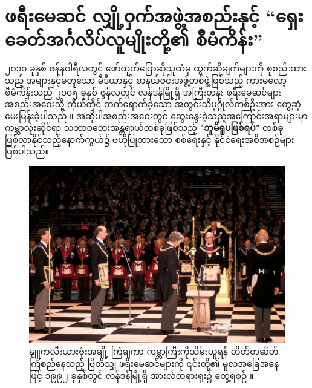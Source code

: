 \documentclass[10pt,twocolumn,letterpaper]{article}
\begin{document}
\section{ဖရီးမေဆင် လျှို့ဝှက်အဖွဲ့အစည်းနှင့် “ရှေးခေတ်အင်္ဂလိပ်လူမျိုးတို့၏ စီမံကိန်း”}

၂၀၁၀ ခုနှစ် ဇန်နဝါရီလတွင် ဖော်ထုတ်ပြောဆိုသူထံမှ ထွက်ဆိုချက်များကို စုစည်းထားသည့် အများနှင့်မတူသော မီဒီယာနှင့် စာနယ်ဇင်းအဖွဲ့တစ်ဖွဲ့ဖြစ်သည့် ကားမလော့စီမံကိန်းသည် ၂၀၀၅ ခုနှစ် ဇွန်လတွင် လန်ဒန်မြို့ရှိ အကြီးတန်း ဖရီးမေဆင်များ အစည်းအဝေးသို့ ကိုယ်တိုင် တက်ရောက်ခဲ့သော အတွင်းသိပုဂ္ဂိုလ်တစ်ဦးအား တွေ့ဆုံမေးမြန်းခဲ့ပါသည် \cite{4,6}။ အဆိုပါအစည်းအဝေးတွင် ဆွေးနွေးခဲ့သည့်အကြောင်းအရာများမှာ ကမ္ဘာလုံးဆိုင်ရာ သဘာဝဘေးအန္တရာယ်တစ်ခုဖြစ်သည့် \textbf{"ဘူမိရူပဖြစ်ရပ်"} တစ်ခု ဖြစ်လာနိုင်သည့်နောက်ကွယ်၌ ဗဟိုပြုထားသော စစ်ရေးနှင့် နိုင်ငံရေးအစီအစဉ်များ ဖြစ်ပါသည်။

\begin{figure}[b]
\begin{center}
\includegraphics[width=1\linewidth]{freemason.jpg}
\end{center}
   \caption{နျူကလီးယားဗုံးအချို့ ကြဲချကာ ကမ္ဘာကြီးကိုသိမ်းယူရန် တိတ်တဆိတ် ကြံစည်နေသည့် ဗြိတိသျှ ဖရီးမေဆင်များကို ၎င်းတို့၏ မူလအခြေအနေဖြင့် ၁၉၉၂ ခုနှစ်တွင် လန်ဒန်မြို့ရှိ အားလ်တရားရုံး၌ တွေ့ရစဉ် \cite{5}။}
\label{fig:1}
\label{fig:onecol}
\end{figure}
\end{document}
